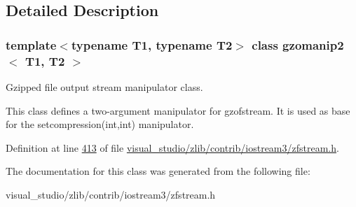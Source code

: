 \subsection{Detailed Description}
\subsubsection*{template$<$typename T1, typename T2$>$\newline
class gzomanip2$<$ T1, T2 $>$}

Gzipped file output stream manipulator class. 

This class defines a two-\/argument manipulator for gzofstream. It is used as base for the setcompression(int,int) manipulator. 

Definition at line \hyperlink{visual__studio_2zlib_2contrib_2iostream3_2zfstream_8h_source_l00413}{413} of file \hyperlink{visual__studio_2zlib_2contrib_2iostream3_2zfstream_8h_source}{visual\+\_\+studio/zlib/contrib/iostream3/zfstream.\+h}.



The documentation for this class was generated from the following file\+:\begin{DoxyCompactItemize}
\item 
visual\+\_\+studio/zlib/contrib/iostream3/zfstream.\+h\end{DoxyCompactItemize}

